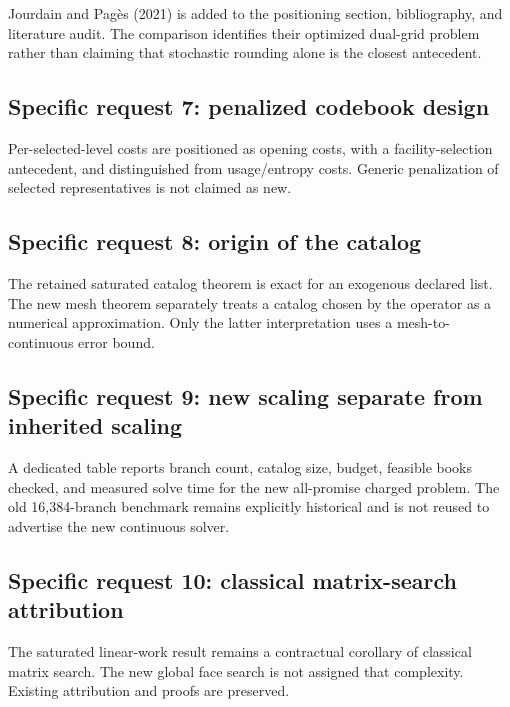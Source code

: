 \documentclass[11pt,letterpaper]{article}
\begin{document}
Jourdain and Pagès (2021) is added to the positioning section, bibliography, and literature audit. The comparison identifies their optimized dual-grid problem rather than claiming that stochastic rounding alone is the closest antecedent.



\subsection*{Specific request 7: penalized codebook design}


Per-selected-level costs are positioned as opening costs, with a facility-selection antecedent, and distinguished from usage/entropy costs. Generic penalization of selected representatives is not claimed as new.



\subsection*{Specific request 8: origin of the catalog}


The retained saturated catalog theorem is exact for an exogenous declared list. The new mesh theorem separately treats a catalog chosen by the operator as a numerical approximation. Only the latter interpretation uses a mesh-to-continuous error bound.



\subsection*{Specific request 9: new scaling separate from inherited scaling}


A dedicated table reports branch count, catalog size, budget, feasible books checked, and measured solve time for the new all-promise charged problem. The old 16,384-branch benchmark remains explicitly historical and is not reused to advertise the new continuous solver.



\subsection*{Specific request 10: classical matrix-search attribution}


The saturated linear-work result remains a contractual corollary of classical matrix search. The new global face search is not assigned that complexity. Existing attribution and proofs are preserved.
\end{document}
